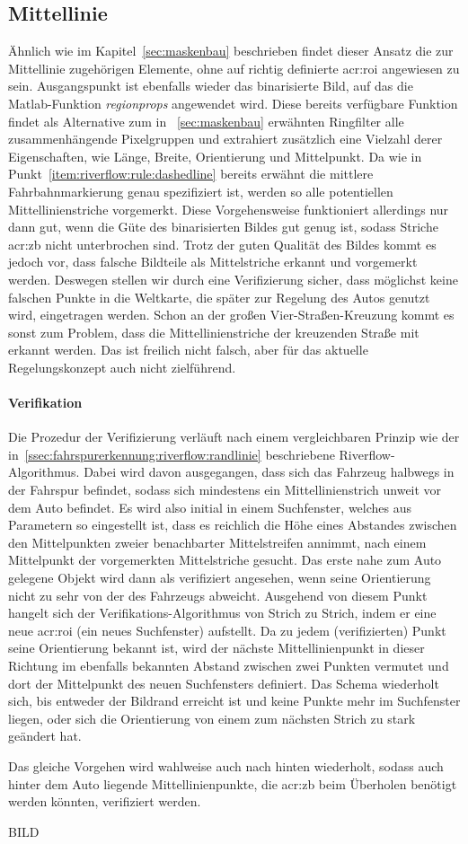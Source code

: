 \subsection{Mittellinie}
\label{ssec:fahrspurerkennung:riverflow:mittellinie}
Ähnlich wie im Kapitel~\ref{sec:maskenbau} beschrieben findet dieser Ansatz die zur Mittellinie zugehörigen Elemente, ohne auf richtig definierte \gls{acr:roi} angewiesen zu sein. Ausgangspunkt ist ebenfalls wieder das binarisierte Bild, auf das die Matlab-Funktion \emph{regionprops} angewendet wird. Diese bereits verfügbare Funktion findet als Alternative zum in ~\ref{sec:maskenbau} erwähnten \glqq Ringfilter\grqq{} alle zusammenhängende Pixelgruppen und extrahiert zusätzlich eine Vielzahl derer Eigenschaften, wie Länge, Breite, Orientierung und Mittelpunkt. Da wie in Punkt~\ref{item:riverflow:rule:dashedline} bereits erwähnt die mittlere Fahrbahnmarkierung genau spezifiziert ist, werden so alle potentiellen Mittellinienstriche vorgemerkt. Diese Vorgehensweise funktioniert allerdings nur dann gut, wenn die Güte des binarisierten Bildes gut genug ist, sodass Striche \gls{acr:zb} nicht unterbrochen sind. Trotz der guten Qualität des Bildes kommt es jedoch vor, dass falsche Bildteile als Mittelstriche erkannt und vorgemerkt werden. Deswegen stellen wir durch eine Verifizierung sicher, dass möglichst keine falschen Punkte in die Weltkarte, die später zur Regelung des Autos genutzt wird, eingetragen werden. Schon an der großen Vier-Straßen-Kreuzung kommt es sonst zum Problem, dass die Mittellinienstriche der kreuzenden Straße mit erkannt werden. Das ist freilich nicht falsch, aber für das aktuelle Regelungskonzept auch nicht zielführend. 

\paragraph{Verifikation}

Die Prozedur der Verifizierung verläuft nach einem vergleichbaren Prinzip wie der in~\ref{ssec:fahrspurerkennung:riverflow:randlinie} beschriebene Riverflow-Algorithmus. Dabei wird davon ausgegangen, dass sich das Fahrzeug halbwegs in der Fahrspur befindet, sodass sich mindestens ein Mittellinienstrich unweit vor dem Auto befindet. Es wird also initial in einem  Suchfenster, welches aus Parametern so eingestellt ist, dass es reichlich die Höhe eines Abstandes zwischen den Mittelpunkten zweier benachbarter Mittelstreifen annimmt, nach einem Mittelpunkt der vorgemerkten Mittelstriche gesucht. Das erste nahe zum Auto gelegene Objekt wird dann als verifiziert angesehen, wenn seine Orientierung nicht zu sehr von der des Fahrzeugs abweicht. Ausgehend von diesem Punkt \glqq hangelt\grqq{} sich der Verifikations-Algorithmus von Strich zu Strich, indem er eine neue \gls{acr:roi} (ein neues Suchfenster) aufstellt. Da zu jedem (verifizierten) Punkt seine Orientierung bekannt ist, wird der nächste Mittellinienpunkt in dieser Richtung im ebenfalls bekannten Abstand zwischen zwei Punkten vermutet und dort der Mittelpunkt des neuen Suchfensters definiert. Das Schema wiederholt sich, bis entweder der Bildrand erreicht ist und keine Punkte mehr im Suchfenster liegen, oder sich die Orientierung von einem zum nächsten Strich zu stark geändert hat.

Das gleiche Vorgehen wird wahlweise auch nach hinten wiederholt, sodass auch hinter dem Auto liegende Mittellinienpunkte, die \gls{acr:zb} beim Überholen benötigt werden könnten, verifiziert werden.

BILD